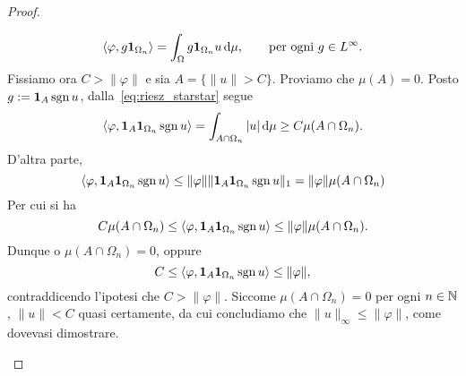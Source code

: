 \begin{proof}
\begin{enumerate}
		\begin{equation}
		\label{eq:riesz_starstar}
			\langle \varphi, g {\boldsymbol{1}}_{\Omega_n} \rangle = \int_\Omega g {\boldsymbol{1}}_{\Omega_n} u\,\mathrm{d}\mu, \qquad \text{per ogni $g \in L^\infty$}.
		\end{equation}
		Fissiamo ora $C > \|\varphi\|$ e sia $A = \{\|u\| > C\}$. Proviamo che $\mu(A) = 0$. Posto $g := {\boldsymbol{1}}_A \operatorname{sgn} u$, dalla~\eqref{eq:riesz_starstar} segue
		\begin{equation*}
			\langle \varphi, {\boldsymbol{1}}_A {\boldsymbol{1}}_{\Omega_n} \operatorname{sgn} u \rangle = \int_{A \cap \Omega_n} |u|\,\mathrm{d}\mu \geq C \mu(A \cap \Omega_n).
		\end{equation*}
		D'altra parte,
		\begin{equation*}
			\langle \varphi, {\boldsymbol{1}}_A {\boldsymbol{1}}_{\Omega_n} \operatorname{sgn} u \rangle \leq \|\varphi\| \|{\boldsymbol{1}}_A {\boldsymbol{1}}_{\Omega_n} \operatorname{sgn} u\|_1 = \|\varphi\| \mu(A \cap \Omega_n)
		\end{equation*}
		Per cui si ha
		\begin{equation*}
			C \mu(A \cap \Omega_n) \leq \langle \varphi, {\boldsymbol{1}}_A {\boldsymbol{1}}_{\Omega_n} \operatorname{sgn} u \rangle \leq \|\varphi\| \mu(A \cap \Omega_n).
		\end{equation*}
		Dunque o $\mu(A \cap \Omega_n) = 0$, oppure
		\begin{equation*}
			C \leq \langle \varphi, {\boldsymbol{1}}_A {\boldsymbol{1}}_{\Omega_n} \operatorname{sgn} u \rangle \leq \|\varphi\|,
		\end{equation*}
		contraddicendo l'ipotesi che $C > \|\varphi\|$. Siccome $\mu(A \cap \Omega_n) = 0$ per ogni $n \in \mathbb{N}$, $\|u\| < C$ quasi certamente, da cui concludiamo che $\|u\|_\infty \leq \|\varphi\|$, come dovevasi dimostrare.


\end{enumerate}
\end{proof}
